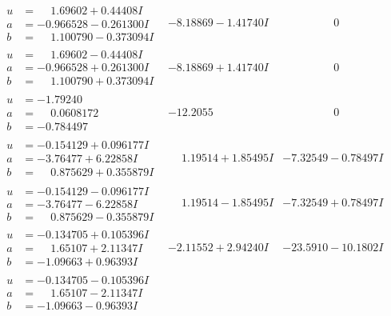 \documentclass[1p]{elsarticle_modified}
\theoremstyle{definition}
\begin{document}
$$\begin{array}{c|c|c}
\begin{aligned}
u &= \phantom{-}1.69602 + 0.44408 I \\
a &= -0.966528 - 0.261300 I \\
b &= \phantom{-}1.100790 - 0.373094 I\end{aligned}
 & -8.18869 - 1.41740 I & \phantom{-0.000000 } 0 \\ \hline\begin{aligned}
u &= \phantom{-}1.69602 - 0.44408 I \\
a &= -0.966528 + 0.261300 I \\
b &= \phantom{-}1.100790 + 0.373094 I\end{aligned}
 & -8.18869 + 1.41740 I & \phantom{-0.000000 } 0 \\ \hline\begin{aligned}
u &= -1.79240\phantom{ +0.000000I} \\
a &= \phantom{-}0.0608172\phantom{ +0.000000I} \\
b &= -0.784497\phantom{ +0.000000I}\end{aligned}
 & -12.2055\phantom{ +0.000000I} & \phantom{-0.000000 } 0 \\ \hline\begin{aligned}
u &= -0.154129 + 0.096177 I \\
a &= -3.76477 + 6.22858 I \\
b &= \phantom{-}0.875629 + 0.355879 I\end{aligned}
 & \phantom{-}1.19514 + 1.85495 I & -7.32549 - 0.78497 I \\ \hline\begin{aligned}
u &= -0.154129 - 0.096177 I \\
a &= -3.76477 - 6.22858 I \\
b &= \phantom{-}0.875629 - 0.355879 I\end{aligned}
 & \phantom{-}1.19514 - 1.85495 I & -7.32549 + 0.78497 I \\ \hline\begin{aligned}
u &= -0.134705 + 0.105396 I \\
a &= \phantom{-}1.65107 + 2.11347 I \\
b &= -1.09663 + 0.96393 I\end{aligned}
 & -2.11552 + 2.94240 I & -23.5910 - 10.1802 I \\ \hline\begin{aligned}
u &= -0.134705 - 0.105396 I \\
a &= \phantom{-}1.65107 - 2.11347 I \\
b &= -1.09663 - 0.96393 I\end{aligned}

\end{array}$$
\end{document}
